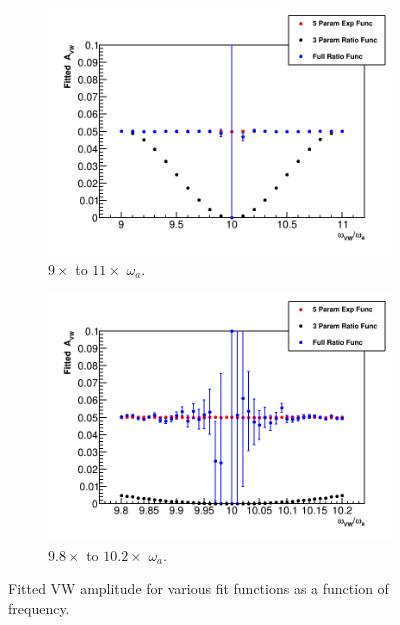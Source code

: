 \documentclass[12pt,letterpaper]{article}
\def\wa{$\omega_{a}$\xspace}
\begin{document}
\begin{figure}[]
\centering
    \begin{subfigure}[]{0.46\textwidth}
        \centering
        \includegraphics[width=\textwidth]{Fitted_Avw_Vs_Wvw-9x-10x}
        \caption{$9\times$ to $11\times$ \wa.}
    \end{subfigure}%
    \hspace{1cm}
    \begin{subfigure}[]{0.46\textwidth}
        \centering
        \includegraphics[width=\textwidth]{Fitted_Avw_Vs_Wvw-10x}
        \caption{$9.8\times$ to $10.2\times$ \wa.}
    \end{subfigure}
\caption[]{Fitted VW amplitude for various fit functions as a function of frequency.}
\label{fig:FittedAVW_myToyMC}
\end{figure}
\end{document}
